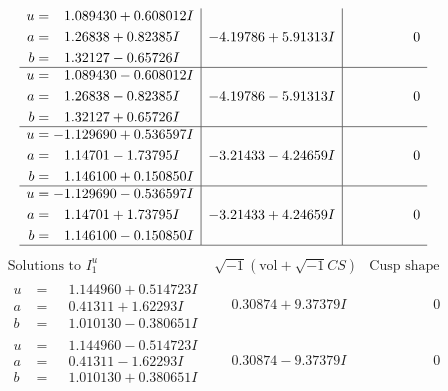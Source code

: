 \documentclass[1p]{elsarticle_modified}
\theoremstyle{definition}
\newcommand{\I}{\sqrt{-1}}
\begin{document}
$$\begin{array}{c|c|c}
\begin{aligned}
u &= \phantom{-}1.089430 + 0.608012 I \\
a &= \phantom{-}1.26838 + 0.82385 I \\
b &= \phantom{-}1.32127 - 0.65726 I\end{aligned}
 & -4.19786 + 5.91313 I & \phantom{-0.000000 } 0 \\ \hline\begin{aligned}
u &= \phantom{-}1.089430 - 0.608012 I \\
a &= \phantom{-}1.26838 - 0.82385 I \\
b &= \phantom{-}1.32127 + 0.65726 I\end{aligned}
 & -4.19786 - 5.91313 I & \phantom{-0.000000 } 0 \\ \hline\begin{aligned}
u &= -1.129690 + 0.536597 I \\
a &= \phantom{-}1.14701 - 1.73795 I \\
b &= \phantom{-}1.146100 + 0.150850 I\end{aligned}
 & -3.21433 - 4.24659 I & \phantom{-0.000000 } 0 \\ \hline\begin{aligned}
u &= -1.129690 - 0.536597 I \\
a &= \phantom{-}1.14701 + 1.73795 I \\
b &= \phantom{-}1.146100 - 0.150850 I\end{aligned}
 & -3.21433 + 4.24659 I & \phantom{-0.000000 } 0\\
 \hline 
 \end{array}$$\newpage$$\begin{array}{c|c|c}  
\text{Solutions to }I^u_{1}& \I (\text{vol} + \sqrt{-1}CS) & \text{Cusp shape}\\
 \hline 
\begin{aligned}
u &= \phantom{-}1.144960 + 0.514723 I \\
a &= \phantom{-}0.41311 + 1.62293 I \\
b &= \phantom{-}1.010130 - 0.380651 I\end{aligned}
 & \phantom{-}0.30874 + 9.37379 I & \phantom{-0.000000 } 0 \\ \hline\begin{aligned}
u &= \phantom{-}1.144960 - 0.514723 I \\
a &= \phantom{-}0.41311 - 1.62293 I \\
b &= \phantom{-}1.010130 + 0.380651 I\end{aligned}
 & \phantom{-}0.30874 - 9.37379 I & \phantom{-0.000000 } 0 \\ \hline\begin{aligned}

\end{aligned}
\end{array}$$
\end{document}
